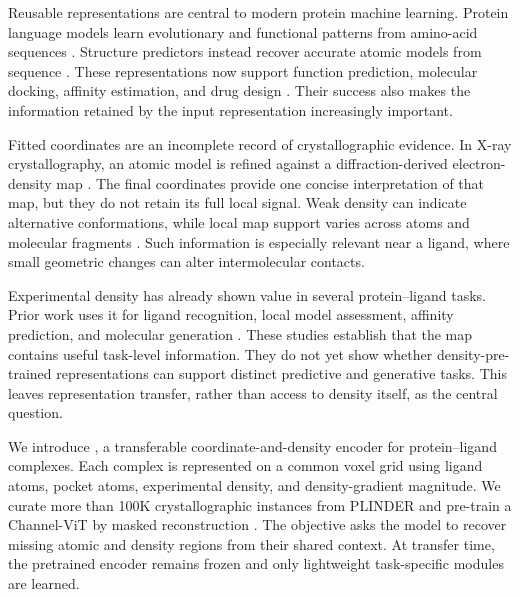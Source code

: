 Reusable representations are central to modern protein machine learning.
Protein language models learn evolutionary and functional patterns from
amino-acid sequences \citep{rives2021biological,lin2023evolutionary}.
Structure predictors instead recover accurate atomic models from sequence
\citep{jumper2021highly,abramson2024accurate}. These representations now support
function prediction, molecular docking, affinity estimation, and drug design
\citep{radivojac2013large,ozturk2018deepdta,pinheiro2024structure}. Their success
also makes the information retained by the input representation increasingly
important.

Fitted coordinates are an incomplete record of crystallographic evidence. In
X-ray crystallography, an atomic model is refined against a diffraction-derived
electron-density map \citep{adams2011phenix}. The final coordinates provide one
concise interpretation of that map, but they do not retain its full local
signal. Weak density can indicate alternative conformations, while local map
support varies across atoms and molecular fragments
\citep{lang2010automated,lang2014protein,meyder2017estimating}. Such information
is especially relevant near a ligand, where small geometric changes can alter
intermolecular contacts.

Experimental density has already shown value in several protein--ligand tasks.
Prior work uses it for ligand recognition, local model assessment, affinity
prediction, and molecular generation
\citep{kowiel2019automatic,miyaguchi2021machine,suriana2025beyond,wang2022pocket}.
These studies establish that the map contains useful task-level information.
They do not yet show whether density-pre-trained representations can support
distinct predictive and generative tasks. This leaves representation transfer,
rather than access to density itself, as the central question.

We introduce \ours{}, a transferable coordinate-and-density encoder for
protein--ligand complexes. Each complex is represented on a common voxel grid
using ligand atoms, pocket atoms, experimental density, and density-gradient
magnitude. We curate more than 100K crystallographic instances from PLINDER and
pre-train a Channel-ViT by masked reconstruction
\citep{durairaj2024plinder,bao2023channel-24a,he2022masked}. The objective asks
the model to recover missing atomic and density regions from their shared
context. At transfer time, the pretrained encoder remains frozen and only
lightweight task-specific modules are learned.

